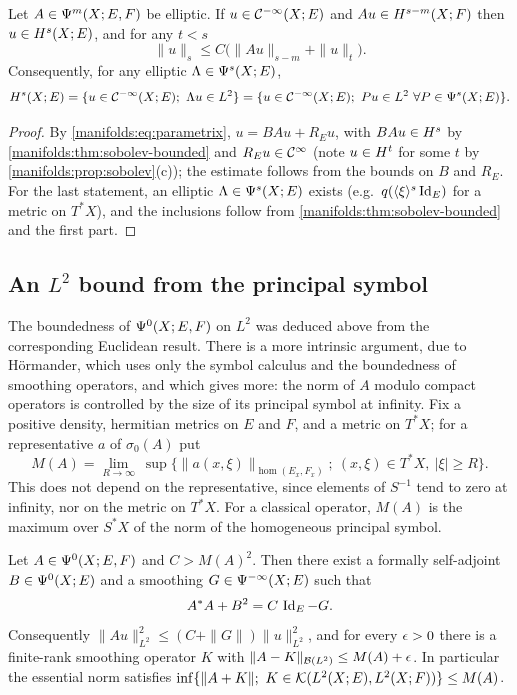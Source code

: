 \begin{proposition}\label{manifolds:prop:elliptic-estimate}
Let $A\in\Psi^{m}(X;E,F)$ be elliptic. If $u\in\mathcal{C}^{-\infty}(X;E)$ and $Au\in H^{s-m}(X;F)$ then
$u\in H^{s}(X;E)$, and for any $t<s$
\begin{equation*}
\|u\|_s\le C\big(\|Au\|_{s-m}+\|u\|_t\big).
\end{equation*}
Consequently, for any elliptic $\Lambda\in\Psi^{s}(X;E)$,
\begin{equation*}
H^{s}(X;E)=\{u\in\mathcal{C}^{-\infty}(X;E);\ \Lambda u\in L^2\}=\{u\in\mathcal{C}^{-\infty}(X;E);\ Pu\in L^2\ \forall P\in\Psi^{s}(X;E)\}.
\end{equation*}
\end{proposition}
\begin{proof}
By \eqref{manifolds:eq:parametrix}, $u=BAu+R_Eu$, with $BAu\in H^{s}$ by
\cref{manifolds:thm:sobolev-bounded} and $R_Eu\in\mathcal{C}^\infty$ (note $u\in H^{t}$ for some
$t$ by \cref{manifolds:prop:sobolev}(c)); the estimate follows from the bounds on
$B$ and $R_E$. For the last statement, an elliptic $\Lambda\in\Psi^{s}(X;E)$ exists
(e.g.\ $q(\langle \xi\rangle^s\operatorname{Id}_E)$ for a metric on $T^*X$), and the inclusions follow from
\cref{manifolds:thm:sobolev-bounded} and the first part.
\end{proof}

\subsection{An \texorpdfstring{$L^2$}{L2} bound from the principal symbol}
The boundedness of $\Psi^{0}(X;E,F)$ on $L^2$ was deduced above from the
corresponding Euclidean result. There is a more intrinsic argument, due to
H\"ormander, which uses only the symbol calculus and the boundedness of smoothing
operators, and which gives more: the norm of $A$ modulo compact operators is
controlled by the size of its principal symbol at infinity. Fix a positive density,
hermitian metrics on $E$ and $F$, and a metric on $T^*X$; for a representative $a$ of
$\sigma_0(A)$ put
\begin{equation*}
M(A)=\lim_{R\to\infty}\ \sup\big\{\|a(x,\xi)\|_{\hom(E_x,F_x)};\ (x,\xi)\in T^*X,\ |\xi|\ge R\big\}.
\end{equation*}
This does not depend on the representative, since elements of $S^{-1}$ tend to zero
at infinity, nor on the metric on $T^*X$. For a classical operator, $M(A)$ is the
maximum over $S^*X$ of the norm of the homogeneous principal symbol.

\begin{proposition}\label{manifolds:prop:L2-bound}
Let $A\in\Psi^{0}(X;E,F)$ and $C>M(A)^2$. Then there exist a formally self-adjoint
$B\in\Psi^{0}(X;E)$ and a smoothing $G\in\Psi^{-\infty}(X;E)$ such that
\begin{equation}\label{manifolds:eq:square-root}
A^*A+B^2=C\,\operatorname{Id}_E-G .
\end{equation}
Consequently $\|Au\|_{L^2}^2\le(C+\|G\|)\|u\|_{L^2}^2$, and for every $\epsilon>0$ there is a
finite-rank smoothing operator $K$ with $\|A-K\|_{\mathcal{B}(L^2)}\le M(A)+\epsilon$. In
particular the essential norm satisfies
$\inf\{\|A+K\|;\ K\in\mathcal{K}(L^2(X;E),L^2(X;F))\}\le M(A)$.
\end{proposition}

